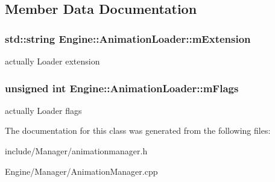 \subsection{Member Data Documentation}
\hypertarget{classEngine_1_1AnimationLoader_a0507d3a76b6f33f05be9fc789138c508}{}
\subsubsection[{m\+Extension}]{\setlength{\rightskip}{0pt plus 5cm}std\+::string Engine\+::\+Animation\+Loader\+::m\+Extension\hspace{0.3cm}{\ttfamily [protected]}}\label{classEngine_1_1AnimationLoader_a0507d3a76b6f33f05be9fc789138c508}
actually Loader extension \hypertarget{classEngine_1_1AnimationLoader_ae6851f3980f517aa5eb62b9bb9f16ed0}{}
\subsubsection[{m\+Flags}]{\setlength{\rightskip}{0pt plus 5cm}unsigned int Engine\+::\+Animation\+Loader\+::m\+Flags\hspace{0.3cm}{\ttfamily [protected]}}\label{classEngine_1_1AnimationLoader_ae6851f3980f517aa5eb62b9bb9f16ed0}
actually Loader flags 

The documentation for this class was generated from the following files\+:\begin{DoxyCompactItemize}
\item 
include/\+Manager/animationmanager.\+h\item 
Engine/\+Manager/Animation\+Manager.\+cpp\end{DoxyCompactItemize}
